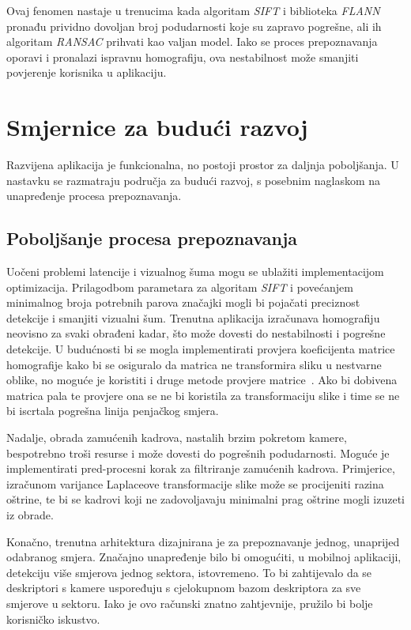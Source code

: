 Ovaj fenomen nastaje u trenucima kada algoritam \textit{SIFT} i biblioteka \textit{FLANN} pronađu prividno dovoljan broj podudarnosti koje su zapravo pogrešne, ali ih algoritam \textit{RANSAC} prihvati kao valjan model. Iako se proces prepoznavanja oporavi i pronalazi ispravnu homografiju, ova nestabilnost može smanjiti povjerenje korisnika u aplikaciju. 

\section{Smjernice za budući razvoj}

Razvijena aplikacija je funkcionalna, no postoji prostor za daljnja poboljšanja. U nastavku se razmatraju područja za budući razvoj, s posebnim naglaskom na unapređenje procesa prepoznavanja.

\subsection{Poboljšanje procesa prepoznavanja}

Uočeni problemi latencije i vizualnog šuma mogu se ublažiti implementacijom optimizacija. Prilagodbom parametara za algoritam \textit{SIFT} i povećanjem minimalnog broja potrebnih parova značajki mogli bi pojačati preciznost detekcije i smanjiti vizualni šum. Trenutna aplikacija izračunava homografiju neovisno za svaki obrađeni kadar, što može dovesti do nestabilnosti i pogrešne detekcije. U budućnosti bi se mogla implementirati provjera koeficijenta matrice homografije kako bi se osiguralo da matrica ne transformira sliku u nestvarne oblike, no moguće je koristiti i druge metode provjere matrice~\cite{algebraic_outlier_rejection_homography}. Ako bi dobivena matrica pala te provjere ona se ne bi koristila za transformaciju slike i time se ne bi iscrtala pogrešna linija penjačkog smjera.

Nadalje, obrada zamućenih kadrova, nastalih brzim pokretom kamere, bespotrebno troši resurse i može dovesti do pogrešnih podudarnosti. Moguće je implementirati pred-procesni korak za filtriranje zamućenih kadrova. Primjerice, izračunom varijance Laplaceove transformacije slike može se procijeniti razina oštrine, te bi se kadrovi koji ne zadovoljavaju minimalni prag oštrine mogli izuzeti iz obrade.

Konačno, trenutna arhitektura dizajnirana je za prepoznavanje jednog, unaprijed odabranog smjera. Značajno unapređenje bilo bi omogućiti, u mobilnoj aplikaciji, detekciju više smjerova jednog sektora, istovremeno. To bi zahtijevalo da se deskriptori s kamere uspoređuju s cjelokupnom bazom deskriptora za sve smjerove u sektoru. Iako je ovo računski znatno zahtjevnije, pružilo bi bolje korisničko iskustvo.


